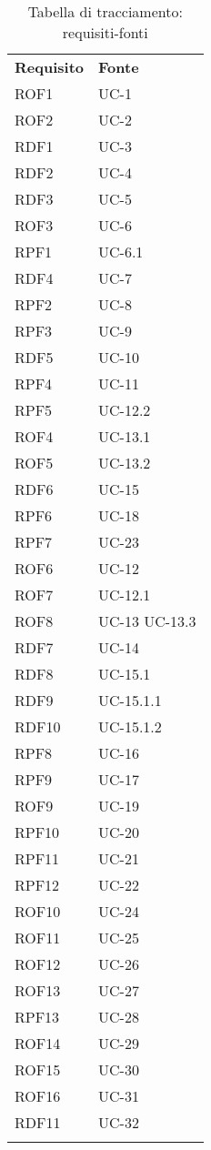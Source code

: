 \begin{longtable}{| p{5cm} | p{5cm} |}
		\rowcolor{LightBlue}
		\color{white}\bfseries Requisito & \color{white}\bfseries Fonte \\[0.25cm]
		\rowcolor{LightGray}
		ROF1 & UC-1 \\
		ROF2 & UC-2 \\
		\rowcolor{LightGray}
		RDF1 & UC-3 \\
		RDF2 & UC-4 \\
		\rowcolor{LightGray}
		RDF3 & UC-5 \\
		ROF3 & UC-6 \\
		\rowcolor{LightGray}
		RPF1 & UC-6.1 \\
		RDF4 & UC-7 \\
		\rowcolor{LightGray}
		RPF2 & UC-8 \\
		RPF3 & UC-9 \\
		\rowcolor{LightGray}
		RDF5 & UC-10 \\
		RPF4 & UC-11 \\
		\rowcolor{LightGray}
		RPF5 &UC-12.2 \\
		ROF4 & UC-13.1 \\
		\rowcolor{LightGray}
		ROF5 & UC-13.2 \\
		RDF6 & UC-15 \\
		\rowcolor{LightGray}
		RPF6 & UC-18 \\
		RPF7 & UC-23 \\
		\rowcolor{LightGray}
		ROF6 & UC-12 \\
		ROF7 & UC-12.1 \\
		\rowcolor{LightGray}
		ROF8 & UC-13 \newline UC-13.3 \\
		RDF7 & UC-14\\
		\rowcolor{LightGray}
		RDF8 & UC-15.1\\
		RDF9 & UC-15.1.1\\
		\rowcolor{LightGray}
		RDF10 & UC-15.1.2\\
		RPF8 & UC-16\\
		\rowcolor{LightGray}
		RPF9 & UC-17\\
		ROF9 & UC-19 \\
		\rowcolor{LightGray}
		RPF10 & UC-20\\
		RPF11 & UC-21 \\
		\rowcolor{LightGray}
		RPF12 & UC-22 \\
		ROF10 & UC-24 \\
		\rowcolor{LightGray}
		ROF11 & UC-25 \\
		ROF12 & UC-26 \\
		\rowcolor{LightGray}
		ROF13 & UC-27 \\
		RPF13 & UC-28 \\
		\rowcolor{LightGray}
		ROF14 & UC-29 \\
		ROF15 & UC-30 \\
		\rowcolor{LightGray}
		ROF16 & UC-31 \\
		RDF11 & UC-32 \\		
		\hline
		\caption{Tabella di tracciamento: requisiti-fonti}
\end{longtable}

